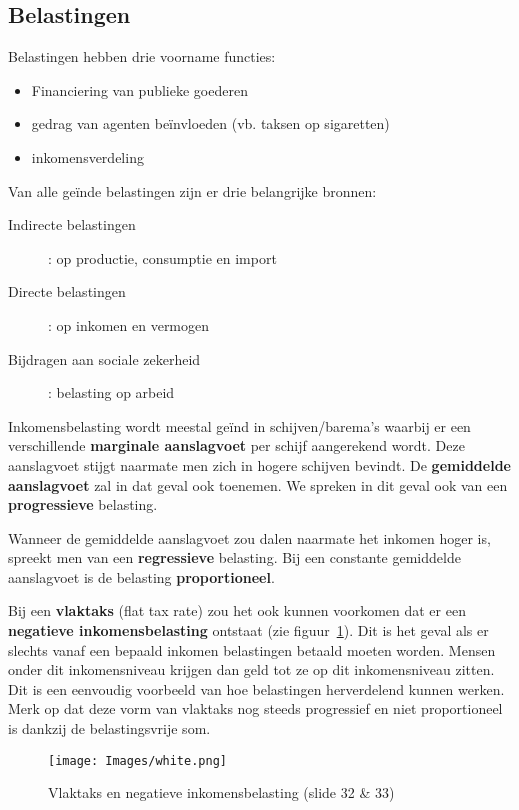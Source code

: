 \subsection{Belastingen}
\label{ssec:belastingen}
Belastingen hebben drie voorname functies:
\begin{itemize}
   \item Financiering van publieke goederen
   \item gedrag van agenten be\"invloeden (vb. taksen op sigaretten)
   \item inkomensverdeling
\end{itemize}
Van alle geïnde belastingen zijn er drie belangrijke bronnen:
\begin{description}
   \item[Indirecte belastingen]: op productie, consumptie en import
   \item[Directe belastingen]:  op inkomen en vermogen
   \item[Bijdragen aan sociale zekerheid]: belasting op arbeid
\end{description}

Inkomensbelasting wordt meestal ge\"ind in schijven/barema's waarbij er een verschillende \textbf{marginale aanslagvoet} per schijf aangerekend wordt. Deze aanslagvoet stijgt naarmate men zich in hogere schijven bevindt. De \textbf{gemiddelde aanslagvoet} zal in dat geval ook toenemen. We spreken in dit geval ook van een \textbf{progressieve} belasting.

Wanneer de gemiddelde aanslagvoet zou dalen naarmate het inkomen hoger is, spreekt men van een \textbf{regressieve} belasting. Bij een constante gemiddelde aanslagvoet is de belasting \textbf{proportioneel}.

Bij een \textbf{vlaktaks} (flat tax rate) zou het ook kunnen voorkomen dat er een \textbf{negatieve inkomensbelasting} ontstaat (zie figuur~\ref{fig:vlaktaks}). Dit is het geval als er slechts vanaf een bepaald inkomen belastingen betaald moeten worden. Mensen onder dit inkomensniveau krijgen dan geld tot ze op dit inkomensniveau zitten. Dit is een eenvoudig voorbeeld van hoe belastingen herverdelend kunnen werken. Merk op dat deze vorm van vlaktaks nog steeds progressief en niet proportioneel is dankzij de belastingsvrije som.
\begin{figure}[htbp]
   \centering
   \texttt{[image: Images/white.png]}
   \caption{Vlaktaks en negatieve inkomensbelasting (slide 32 \& 33)}
   \label{fig:vlaktaks}
\end{figure}

